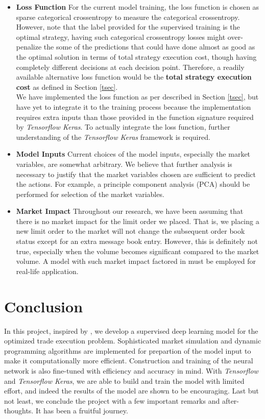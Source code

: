 \documentclass[12pt]{extarticle}
\begin{document}
\begin{itemize}
  \item \textbf{Loss Function} For the current model training, the loss function is chosen as
  sparse categorical crossentropy to measure the categorical crossentropy.
  However, note that the label provided for the supervised training is the optimal
  strategy, having such categorical crossentropy losses might over-penalize the
  some of the predictions that could have done almost as good as the optimal solution
  in terms of total strategy execution cost, though having completely different decisions
  at each decision point. Therefore, a readily available alternative loss function
  would be the \textbf{total strategy execution cost} as defined in Section \ref{tsec}.\\


  We have implemented the loss function as per described in Section \ref{tsec}, but have yet
  to integrate it to the training process because the implementation requires
  extra inputs than those provided in the function signature required by \textit{Tensorflow Keras}.
  To actually integrate the loss function, further understanding of the \textit{Tensorflow Keras}
  framework is required.

  \item \textbf{Model Inputs} Current choices of the model inputs, especially the
  market variables, are somewhat arbitrary. We believe that further analysis is necessary
  to justify that the market variables chosen are sufficient to predict the actions.
  For example, a principle component analysis (PCA) should be performed for selection of the
  market variables.

  \item \textbf{Market Impact} Throughout our research, we have been assuming that
  there is no market impact for the limit order we placed. That is, we placing a new
  limit order to the market will not change the subsequent order book status except
  for an extra message book entry. However, this is definitely not true, especially
  when the volume becomes significant compared to the market volume. A model with such
  market impact factored in \cite{market-impact} must be employed for real-life application.
\end{itemize}

\section{Conclusion}
In this project, inspired by \cite{reinforcement}, we develop a supervised deep learning model for the optimized trade
execution problem. Sophisticated market simulation and dynamic programming algorithms
are implemented for prepartion of the model input to make it computationally more
efficient. Construction and training of the neural network is also fine-tuned with
efficiency and accuracy in mind. With \textit{Tensorflow} and \textit{Tensorflow Keras},
we are able to build and train the model with limited effort, and indeed the results of the
model are shown to be encouraging. Last but not least, we conclude the project with
a few important remarks and after-thoughts. It has been a fruitful journey.
\end{document}
